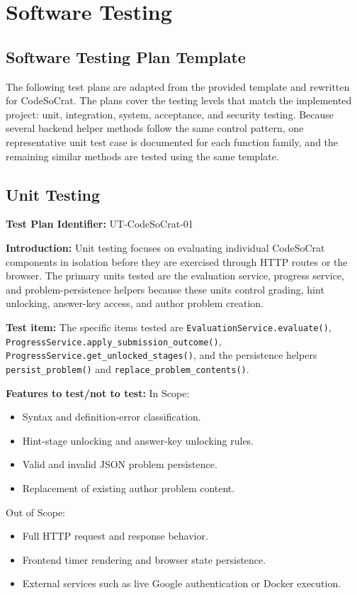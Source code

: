 \section{Software Testing}

\subsection{Software Testing Plan Template}
The following test plans are adapted from the provided template and rewritten for CodeSoCrat. The plans cover the testing levels that match the implemented project: unit, integration, system, acceptance, and security testing. Because several backend helper methods follow the same control pattern, one representative unit test case is documented for each function family, and the remaining similar methods are tested using the same template.

\subsection{Unit Testing}
\textbf{Test Plan Identifier:}
UT-CodeSoCrat-01

\textbf{Introduction:}
Unit testing focuses on evaluating individual CodeSoCrat components in isolation before they are exercised through HTTP routes or the browser. The primary units tested are the evaluation service, progress service, and problem-persistence helpers because these units control grading, hint unlocking, answer-key access, and author problem creation.

\textbf{Test item:}
The specific items tested are \texttt{EvaluationService.evaluate()}, \texttt{ProgressService.apply\_submission\_outcome()}, \texttt{ProgressService.get\_unlocked\_stages()}, and the persistence helpers \texttt{persist\_problem()} and \texttt{replace\_problem\_contents()}.

\textbf{Features to test/not to test:}
In Scope:
\begin{itemize}
    \item Syntax and definition-error classification.
    \item Hint-stage unlocking and answer-key unlocking rules.
    \item Valid and invalid JSON problem persistence.
    \item Replacement of existing author problem content.
\end{itemize}

Out of Scope:
\begin{itemize}
    \item Full HTTP request and response behavior.
    \item Frontend timer rendering and browser state persistence.
    \item External services such as live Google authentication or Docker execution.
\end{itemize}

